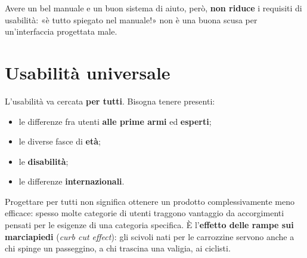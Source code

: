 Avere un bel manuale e un buon sistema di aiuto, però, \textbf{non riduce} i requisiti di usabilità: «è tutto spiegato
nel manuale!» non è una buona scusa per un'interfaccia progettata male.


\section{Usabilità universale}

L'usabilità va cercata \textbf{per tutti}. Bisogna tenere presenti:

\begin{itemize}
  \item le differenze fra utenti \textbf{alle prime armi} ed \textbf{esperti};
  \item le diverse fasce di \textbf{età};
  \item le \textbf{disabilità};
  \item le differenze \textbf{internazionali}.
\end{itemize}

Progettare per tutti non significa ottenere un prodotto complessivamente meno efficace: spesso molte categorie di utenti
traggono vantaggio da accorgimenti pensati per le esigenze di una categoria specifica. È l'\textbf{effetto delle rampe
sui marciapiedi} (\textit{curb cut effect}): gli scivoli nati per le carrozzine servono anche a chi spinge un passeggino,
a chi trascina una valigia, ai ciclisti.

\begin{center}
\end{center}

